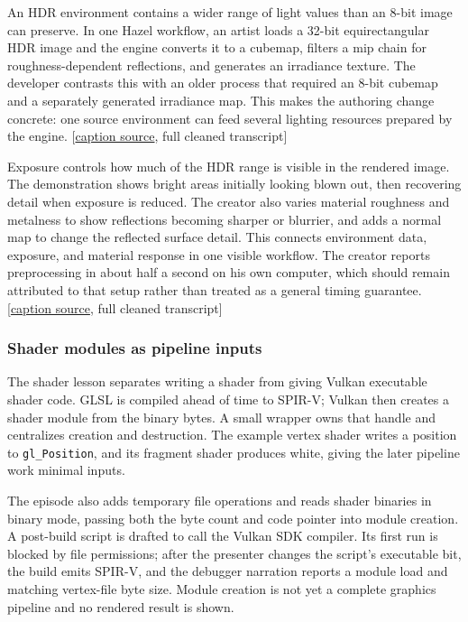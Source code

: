 An HDR environment contains a wider range of light values than an 8-bit image can preserve. In one Hazel workflow, an artist loads a 32-bit equirectangular HDR image and the engine converts it to a cubemap, filters a mip chain for roughness-dependent reflections, and generates an irradiance texture. The developer contrasts this with an older process that required an 8-bit cubemap and a separately generated irradiance map. This makes the authoring change concrete: one source environment can feed several lighting resources prepared by the engine. {[}\href{https://www.youtube.com/watch?v=mzJ60W8I_bk}{caption source}, full cleaned transcript{]}

Exposure controls how much of the HDR range is visible in the rendered image. The demonstration shows bright areas initially looking blown out, then recovering detail when exposure is reduced. The creator also varies material roughness and metalness to show reflections becoming sharper or blurrier, and adds a normal map to change the reflected surface detail. This connects environment data, exposure, and material response in one visible workflow. The creator reports preprocessing in about half a second on his own computer, which should remain attributed to that setup rather than treated as a general timing guarantee. {[}\href{https://www.youtube.com/watch?v=mzJ60W8I_bk}{caption source}, full cleaned transcript{]}

\subsubsection{Shader modules as pipeline inputs}\label{06-engine-ii-ch025-shader-modules-as-pipeline-inputs}

The shader lesson separates writing a shader from giving Vulkan executable shader code. GLSL is compiled ahead of time to SPIR-V; Vulkan then creates a shader module from the binary bytes. A small wrapper owns that handle and centralizes creation and destruction. The example vertex shader writes a position to \texttt{gl\_Position}, and its fragment shader produces white, giving the later pipeline work minimal inputs.

The episode also adds temporary file operations and reads shader binaries in binary mode, passing both the byte count and code pointer into module creation. A post-build script is drafted to call the Vulkan SDK compiler. Its first run is blocked by file permissions; after the presenter changes the script's executable bit, the build emits SPIR-V, and the debugger narration reports a module load and matching vertex-file byte size. Module creation is not yet a complete graphics pipeline and no rendered result is shown.


